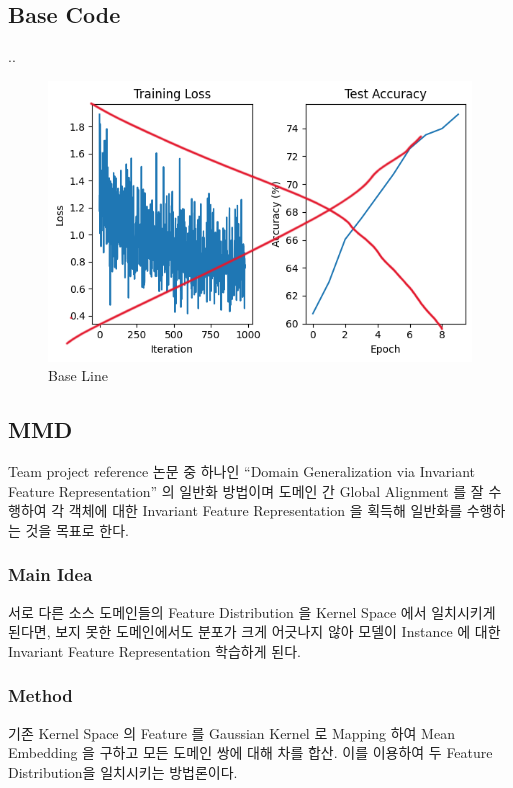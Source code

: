 \subsection{Base Code}
..

\begin{figure}[h]
  \centering
  \includegraphics[width=\linewidth]{images/temp.png}
  \caption{Base Line}
  \label{fig:BASE1}
\end{figure}

\subsection{MMD}
Team project reference 논문 중 하나인 “Domain Generalization via Invariant 
Feature Representation” 의 일반화 방법이며 도메인 간 Global Alignment 를 잘 수행하여 각 
객체에 대한 Invariant Feature Representation 을 획득해 일반화를 수행하는 것을 목표로 한다.

\subsubsection{Main Idea}
서로 다른 소스 도메인들의 Feature Distribution 을 Kernel Space 에서 일치시키게 된다면, 
보지 못한 도메인에서도 분포가 크게 어긋나지 않아 모델이 Instance 에 대한 Invariant Feature 
Representation 학습하게 된다.

\subsubsection{Method}
기존 Kernel Space 의 Feature 를 Gaussian Kernel 로 Mapping 하여 Mean 
Embedding 을 구하고 모든 도메인 쌍에 대해 차를 합산. 이를 이용하여 두 Feature Distribution을 
일치시키는 방법론이다.

